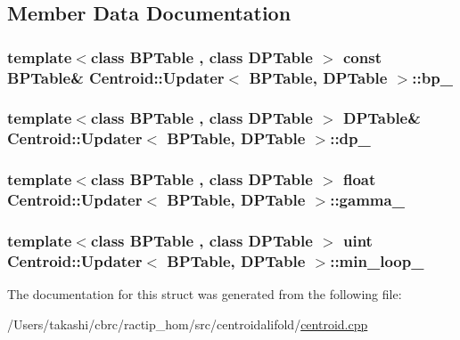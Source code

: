 \subsection{Member Data Documentation}
\hypertarget{struct_centroid_1_1_updater_a9769d7141589366c4e6d031b267c8dc4}{
\subsubsection[{bp\+\_\+}]{\setlength{\rightskip}{0pt plus 5cm}template$<$class B\+P\+Table , class D\+P\+Table $>$ const {\bf B\+P\+Table}\& {\bf Centroid\+::\+Updater}$<$ {\bf B\+P\+Table}, D\+P\+Table $>$\+::bp\+\_\+}}\label{struct_centroid_1_1_updater_a9769d7141589366c4e6d031b267c8dc4}
\hypertarget{struct_centroid_1_1_updater_ad9d56e0acfb53e8a044c674aa9044381}{
\subsubsection[{dp\+\_\+}]{\setlength{\rightskip}{0pt plus 5cm}template$<$class B\+P\+Table , class D\+P\+Table $>$ D\+P\+Table\& {\bf Centroid\+::\+Updater}$<$ {\bf B\+P\+Table}, D\+P\+Table $>$\+::dp\+\_\+}}\label{struct_centroid_1_1_updater_ad9d56e0acfb53e8a044c674aa9044381}
\hypertarget{struct_centroid_1_1_updater_a3dd3233bf978ca8c9b5b7d424120b777}{
\subsubsection[{gamma\+\_\+}]{\setlength{\rightskip}{0pt plus 5cm}template$<$class B\+P\+Table , class D\+P\+Table $>$ float {\bf Centroid\+::\+Updater}$<$ {\bf B\+P\+Table}, D\+P\+Table $>$\+::gamma\+\_\+}}\label{struct_centroid_1_1_updater_a3dd3233bf978ca8c9b5b7d424120b777}
\hypertarget{struct_centroid_1_1_updater_a8de12893eea4e0759964678717585026}{
\subsubsection[{min\+\_\+loop\+\_\+}]{\setlength{\rightskip}{0pt plus 5cm}template$<$class B\+P\+Table , class D\+P\+Table $>$ {\bf uint} {\bf Centroid\+::\+Updater}$<$ {\bf B\+P\+Table}, D\+P\+Table $>$\+::min\+\_\+loop\+\_\+}}\label{struct_centroid_1_1_updater_a8de12893eea4e0759964678717585026}


The documentation for this struct was generated from the following file\+:\begin{DoxyCompactItemize}
\item 
/\+Users/takashi/cbrc/ractip\+\_\+hom/src/centroidalifold/\hyperlink{centroid_8cpp}{centroid.\+cpp}\end{DoxyCompactItemize}
